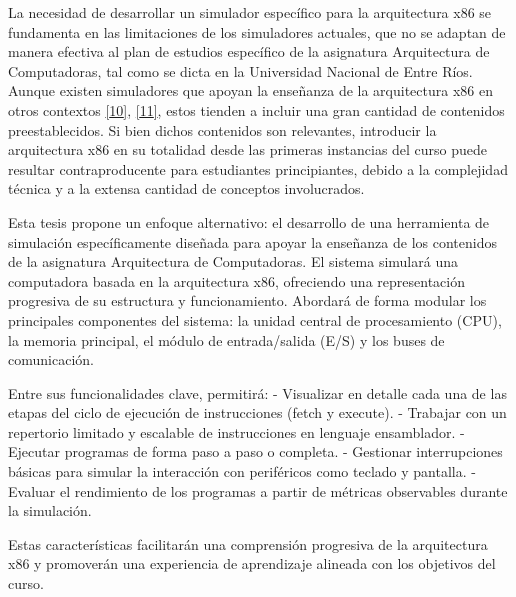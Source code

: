 \documentclass[12pt,oneside]{templates/unerthesis}
\begin{document}
La necesidad de desarrollar un simulador específico para la arquitectura x86 se fundamenta en las limitaciones de los simuladores actuales, que no se adaptan de manera efectiva al plan de estudios específico de la asignatura Arquitectura de Computadoras, tal como se dicta en la Universidad Nacional de Entre Ríos. Aunque existen simuladores que apoyan la enseñanza de la arquitectura x86 en otros contextos \protect\hyperlink{ref-radivojevic_design_2011}{{[}10{]}}, \protect\hyperlink{ref-nikolic_survey_2009}{{[}11{]}}, estos tienden a incluir una gran cantidad de contenidos preestablecidos. Si bien dichos contenidos son relevantes, introducir la arquitectura x86 en su totalidad desde las primeras instancias del curso puede resultar contraproducente para estudiantes principiantes, debido a la complejidad técnica y a la extensa cantidad de conceptos involucrados.

Esta tesis propone un enfoque alternativo: el desarrollo de una herramienta de simulación específicamente diseñada para apoyar la enseñanza de los contenidos de la asignatura Arquitectura de Computadoras. El sistema simulará una computadora basada en la arquitectura x86, ofreciendo una representación progresiva de su estructura y funcionamiento. Abordará de forma modular los principales componentes del sistema: la unidad central de procesamiento (CPU), la memoria principal, el módulo de entrada/salida (E/S) y los buses de comunicación.

Entre sus funcionalidades clave, permitirá:
- Visualizar en detalle cada una de las etapas del ciclo de ejecución de instrucciones (fetch y execute).
- Trabajar con un repertorio limitado y escalable de instrucciones en lenguaje ensamblador.
- Ejecutar programas de forma paso a paso o completa.
- Gestionar interrupciones básicas para simular la interacción con periféricos como teclado y pantalla.
- Evaluar el rendimiento de los programas a partir de métricas observables durante la simulación.

Estas características facilitarán una comprensión progresiva de la arquitectura x86 y promoverán una experiencia de aprendizaje alineada con los objetivos del curso.
\end{document}
